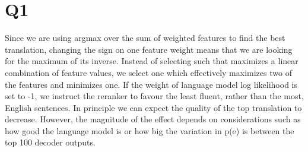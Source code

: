 \section*{Q1}

Since we are using argmax over the sum of weighted features to find the best translation, changing the sign on one feature weight means that we are looking for the maximum of its inverse. Instead of selecting  such that maximizes a linear combination of feature values, we select one which effectively maximizes two of the features and minimizes one. If the weight of language model log likelihood is set to -1, we instruct the reranker to favour the least fluent, rather than the most, English sentences. In principle we can expect the quality of the top translation to decrease. However, the magnitude of the effect depends on considerations such as how good the language model is or how big the variation in p(e) is between the top 100 decoder outputs.